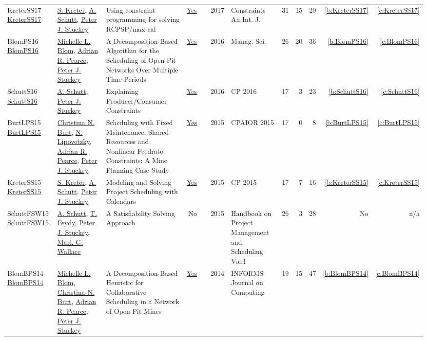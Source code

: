 {\begin{longtable}{>{\raggedright\arraybackslash}p{3cm}>{\raggedright\arraybackslash}p{6cm}>{\raggedright\arraybackslash}p{6.5cm}rrrp{2.5cm}rrrrr}
KreterSS17 \href{https://doi.org/10.1007/s10601-016-9266-6}{KreterSS17} & \hyperref[auth:a124]{S. Kreter}, \hyperref[auth:a125]{A. Schutt}, \hyperref[auth:a126]{Peter J. Stuckey} & Using constraint programming for solving RCPSP/max-cal & \href{../works/KreterSS17.pdf}{Yes} & \cite{KreterSS17} & 2017 & Constraints An Int. J. & 31 & 15 & 20 & \ref{b:KreterSS17} & \ref{c:KreterSS17}\\
BlomPS16 \href{https://doi.org/10.1287/mnsc.2015.2284}{BlomPS16} & \hyperref[auth:a807]{Michelle L. Blom}, \hyperref[auth:a328]{Adrian R. Pearce}, \hyperref[auth:a126]{Peter J. Stuckey} & A Decomposition-Based Algorithm for the Scheduling of Open-Pit Networks Over Multiple Time Periods & \href{../works/BlomPS16.pdf}{Yes} & \cite{BlomPS16} & 2016 & Manag. Sci. & 26 & 20 & 36 & \ref{b:BlomPS16} & \ref{c:BlomPS16}\\
SchuttS16 \href{https://doi.org/10.1007/978-3-319-44953-1\_28}{SchuttS16} & \hyperref[auth:a125]{A. Schutt}, \hyperref[auth:a126]{Peter J. Stuckey} & Explaining Producer/Consumer Constraints & \href{../works/SchuttS16.pdf}{Yes} & \cite{SchuttS16} & 2016 & CP 2016 & 17 & 3 & 23 & \ref{b:SchuttS16} & \ref{c:SchuttS16}\\
BurtLPS15 \href{https://doi.org/10.1007/978-3-319-18008-3\_7}{BurtLPS15} & \hyperref[auth:a326]{Christina N. Burt}, \hyperref[auth:a327]{N. Lipovetzky}, \hyperref[auth:a328]{Adrian R. Pearce}, \hyperref[auth:a126]{Peter J. Stuckey} & Scheduling with Fixed Maintenance, Shared Resources and Nonlinear Feedrate Constraints: {A} Mine Planning Case Study & \href{../works/BurtLPS15.pdf}{Yes} & \cite{BurtLPS15} & 2015 & CPAIOR 2015 & 17 & 0 & 8 & \ref{b:BurtLPS15} & \ref{c:BurtLPS15}\\
KreterSS15 \href{https://doi.org/10.1007/978-3-319-23219-5\_19}{KreterSS15} & \hyperref[auth:a124]{S. Kreter}, \hyperref[auth:a125]{A. Schutt}, \hyperref[auth:a126]{Peter J. Stuckey} & Modeling and Solving Project Scheduling with Calendars & \href{../works/KreterSS15.pdf}{Yes} & \cite{KreterSS15} & 2015 & CP 2015 & 17 & 7 & 16 & \ref{b:KreterSS15} & \ref{c:KreterSS15}\\
SchuttFSW15 \href{https://doi.org/10.1007/978-3-319-05443-8_7}{SchuttFSW15} & \hyperref[auth:a125]{A. Schutt}, \hyperref[auth:a155]{T. Feydy}, \hyperref[auth:a126]{Peter J. Stuckey}, \hyperref[auth:a156]{Mark G. Wallace} & A Satisfiability Solving Approach & No & \cite{SchuttFSW15} & 2015 & Handbook on Project Management and Scheduling Vol.1 & 26 & 3 & 28 & No & n/a\\
BlomBPS14 \href{https://doi.org/10.1287/ijoc.2013.0590}{BlomBPS14} & \hyperref[auth:a807]{Michelle L. Blom}, \hyperref[auth:a326]{Christina N. Burt}, \hyperref[auth:a328]{Adrian R. Pearce}, \hyperref[auth:a126]{Peter J. Stuckey} & A Decomposition-Based Heuristic for Collaborative Scheduling in a Network of Open-Pit Mines & \href{../works/BlomBPS14.pdf}{Yes} & \cite{BlomBPS14} & 2014 & INFORMS Journal on Computing & 19 & 15 & 47 & \ref{b:BlomBPS14} & \ref{c:BlomBPS14}\\

\end{longtable}}

